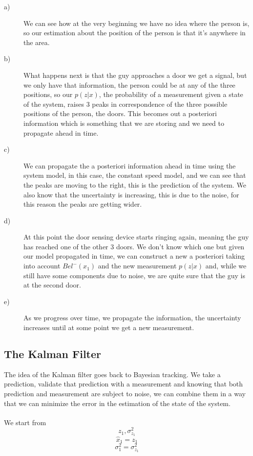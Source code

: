 \begin{description}

\item [a)] We can see how at the very beginning we have no idea where the person is, so our estimation about the position of the person is that it's anywhere in the area.
\item [b)] What happens next is that the guy approaches a door we get a signal, but we only have that information, the person could be at any of the three positions, so our $p(z|x)$, the probability of a measurement given a state of the system, raises 3 peaks in correspondence of the three possible positions of the person, the doors. This becomes out a posteriori information which is something that we are storing and we need to propagate ahead  in time.
\item [c)] We can propagate the a posteriori information ahead in time using the system model, in this case, the constant speed model, and we can see that the peaks are moving to the right, this is the prediction of the system. We also know that the uncertainty is increasing, this is due to the noise, for this reason the peaks are getting wider.
\item [d)] At this point the door sensing device starts ringing again, meaning the guy has reached one of the other 3 doors. We don't know which one but given our model propagated in time, we can construct a new a posteriori taking into account $Bel^{-}(x_1)$ and the new measurement $p(z|x)$ and, while we still have some components due to noise, we are quite sure that the guy is at the second door.
\item [e)] As we progress over time, we propagate the information, the uncertainty increases until at some point we get a new measurement.
\end{description}

\subsection{The Kalman Filter}

The idea of the Kalman filter goes back to Bayesian tracking. We take a prediction, validate that prediction with a measurement and knowing that both prediction and measurement are subject to noise, we can combine them in a way that we can minimize the error in the estimation of the state of the system.
\\\\
We start from
\[
    z_1, \sigma^2_{z_1}    
\]
\[
    \hat{x}_1 = z_1
\]
\[
    \sigma^2_1 = \sigma^2_{z_1}    
\]

